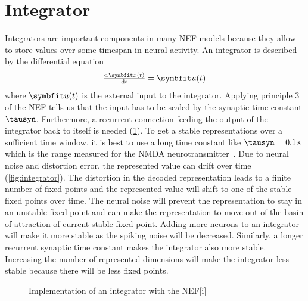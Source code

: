\section{Integrator}
Integrators are important components in many NEF models because they allow to store values over some timespan in neural activity.
An integrator is described by the differential equation
\begin{equation}
    \od{\vc x(t)}{t} = \vc u(t)
\end{equation}
where $\vc u(t)$ is the external input to the integrator.
Applying principle 3 of the NEF tells us that the input has to be scaled by the synaptic time constant $\tausyn$.
Furthermore, a recurrent connection feeding the output of the integrator back to itself is needed (\cref{fig:integrator-net}).
To get a stable representations over a sufficient time window, it is best to use a long time constant like $\tausyn = \SI{0.1}{\second}$ which is the range measured for the NMDA neurotransmitter~\parencite{sah1990-1,moreno-bote2005}.
Due to neural noise and distortion error, the represented value can drift over time (\cref{fig:integrator}).
The distortion in the decoded representation leads to a finite number of fixed points and the represented value will shift to one of the stable fixed points over time.
The neural noise will prevent the representation to stay in an unstable fixed point and can make the representation to move out of the basin of attraction of current stable fixed point.
Adding more neurons to an integrator will make it more stable as the spiking noise will be decreased.
Similarly, a longer recurrent synaptic time constant makes the integrator also more stable.
Increasing the number of represented dimensions will make the integrator less stable because there will be less fixed points.
\begin{figure}
    \begin{captionbeside}{Implementation of an integrator with the NEF}[i]
    \end{captionbeside}\label{fig:integrator-net}
\end{figure}
